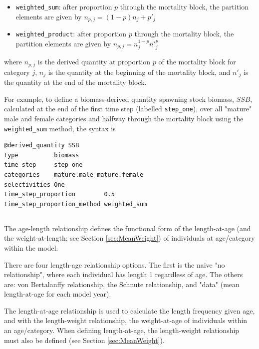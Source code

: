 \begin{itemize}
	\item \texttt{weighted\_sum}: after proportion $p$ through the mortality block, the partition elements are given by $n_{p,j} = (1 - p)n_j + p'_j$

	\item \texttt{weighted\_product}: after proportion $p$ through the mortality block, the partition elements are given by $n_{p,j} = n_j^{1-p} n'^p_j$
\end{itemize}

where $n_{p,j}$ is the derived quantity at proportion $p$ of the mortality block for category $j$, $n_j$ is the quantity at the beginning of the mortality block, and $n'_j$ is the quantity at the end of the mortality block.

For example, to define a biomass-derived quantity spawning stock biomass, $SSB$, calculated at the end of the first time step (labelled \texttt{step\_one}), over all "mature" male and female categories and halfway through the mortality block using the \texttt{weighted\_sum} method, the syntax is

{\small{\begin{verbatim}
@derived_quantity SSB
type          biomass
time_step     step_one
categories    mature.male mature.female
selectivities One
time_step_proportion        0.5
time_step_proportion_method weighted_sum
\end{verbatim}}}

\subsection{\label{sec:AgeLength}}

The age-length relationship defines the functional form of the length-at-age (and the weight-at-length; see Section \ref{sec:MeanWeight}) of individuals at age/category within the model.

There are four length-age relationship options. The first is the naive "no relationship", where each individual has length 1 regardless of age. The others are:  von Bertalanffy relationship, the Schnute relationship, and "data" (mean length-at-age for each model year).

The length-at-age relationship is used to calculate the length frequency given age, and with the length-weight relationship, the weight-at-age of individuals within an age/category. When defining length-at-age, the length-weight relationship must also be defined (see Section \ref{sec:MeanWeight}).


